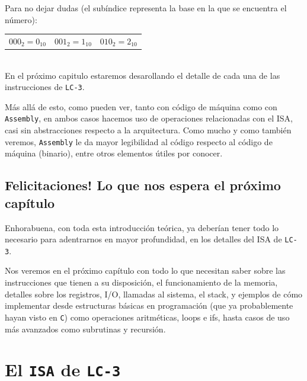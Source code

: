 \documentclass[a4paper, titlepage]{report}
\begin{document}
	Para no dejar dudas (el subíndice representa la base en la que se encuentra el número): \vspace{3pt}
	
	\noindent\begin{tabularx}{\textwidth}{>{\centering\arraybackslash}X >{\centering\arraybackslash}X >{\centering\arraybackslash}X}
		$000_2 = 0_{10}$ & $001_2 = 1_{10}$ & $010_2 = 2_{10}$
	\end{tabularx}\\
	
	En el próximo capitulo estaremos desarollando el detalle de cada una de las instrucciones de \texttt{LC-3}.
	
	Más allá de esto, como pueden ver, tanto con código de máquina como con \texttt{Assembly}, en ambos casos hacemos uso de operaciones relacionadas con el ISA, casi sin abstracciones respecto a la arquitectura. Como mucho y como también veremos, \texttt{Assembly} le da mayor legibilidad al código respecto al código de máquina (binario), entre otros elementos útiles por conocer.
	
	\section{Felicitaciones! Lo que nos espera el próximo capítulo}

	Enhorabuena, con toda esta introducción teórica, ya deberían tener todo lo necesario para adentrarnos en mayor profundidad, en los detalles del ISA de \texttt{LC-3}.
	
	Nos veremos en el próximo capítulo con todo lo que necesitan saber sobre las instrucciones que tienen a su disposición, el funcionamiento de la memoria, detalles sobre los registros, I/O, llamadas al sistema, el stack, y ejemplos de cómo implementar desde estructuras básicas en programación (que ya probablemente hayan visto en \texttt{C}) como operaciones aritméticas, loops e ifs, hasta casos de uso más avanzados como subrutinas y recursión.
	
	
	
	\chapter{El \texttt{ISA} de \texttt{LC-3}}
	
\end{document}
